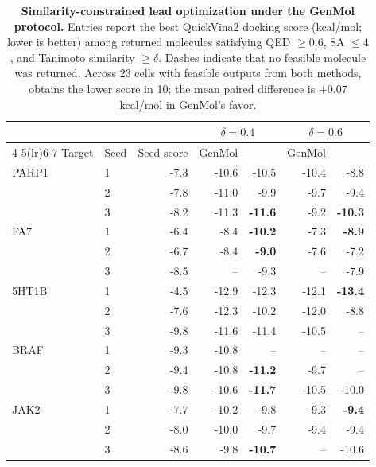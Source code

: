 \begin{table}[!ht]
\centering
{\footnotesize
\begin{tabular}{llr rr rr}
\toprule
& & & \multicolumn{2}{c}{$\delta = 0.4$} & \multicolumn{2}{c}{$\delta = 0.6$} \\
\cmidrule(lr){4-5}\cmidrule(lr){6-7}
Target & Seed & Seed score & GenMol & \method{} & GenMol & \method{} \\
\midrule
PARP1 & 1 & -7.3 & -10.6 & -10.5 & -10.4 & -8.8 \\
 & 2 & -7.8 & -11.0 & -9.9 & -9.7 & -9.4 \\
 & 3 & -8.2 & -11.3 & \textbf{-11.6} & -9.2 & \textbf{-10.3} \\
\midrule
FA7 & 1 & -6.4 & -8.4 & \textbf{-10.2} & -7.3 & \textbf{-8.9} \\
 & 2 & -6.7 & -8.4 & \textbf{-9.0} & -7.6 & -7.2 \\
 & 3 & -8.5 & -- & -9.3 & -- & -7.9 \\
\midrule
5HT1B & 1 & -4.5 & -12.9 & -12.3 & -12.1 & \textbf{-13.4} \\
 & 2 & -7.6 & -12.3 & -10.2 & -12.0 & -8.8 \\
 & 3 & -9.8 & -11.6 & -11.4 & -10.5 & -- \\
\midrule
BRAF & 1 & -9.3 & -10.8 & -- & -- & -- \\
 & 2 & -9.4 & -10.8 & \textbf{-11.2} & -9.7 & -- \\
 & 3 & -9.8 & -10.6 & \textbf{-11.7} & -10.5 & -10.0 \\
\midrule
JAK2 & 1 & -7.7 & -10.2 & -9.8 & -9.3 & \textbf{-9.4} \\
 & 2 & -8.0 & -10.0 & -9.7 & -9.4 & -9.4 \\
 & 3 & -8.6 & -9.8 & \textbf{-10.7} & -- & -10.6 \\
\bottomrule
\end{tabular}}
\caption{\small\textbf{Similarity-constrained lead optimization under the GenMol protocol.}
Entries report the best QuickVina2 docking score (kcal/mol; lower is better) among
returned molecules satisfying QED $\geq0.6$, SA $\leq4$, and Tanimoto similarity
$\geq\delta$. Dashes indicate that no feasible molecule was returned. Across 23 cells with
feasible outputs from both methods, \method{} obtains the lower score in 10; the mean
paired difference is $+0.07$ kcal/mol in GenMol's favor.}
\label{tab:t4}
\end{table}
